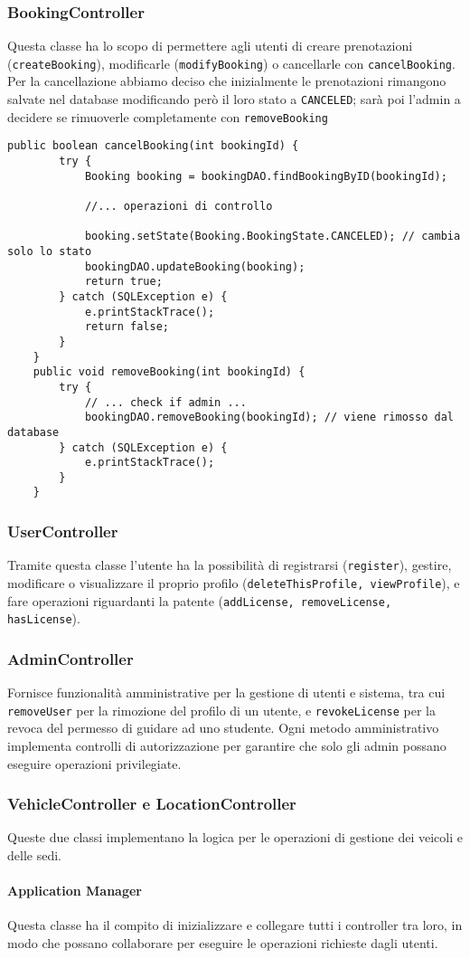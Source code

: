 \subsubsection{BookingController}
Questa classe ha lo scopo di permettere agli utenti di creare prenotazioni (\texttt{createBooking}), modificarle (\texttt{modifyBooking}) o cancellarle con \texttt{cancelBooking}. Per la cancellazione abbiamo deciso che inizialmente le prenotazioni rimangono salvate nel database modificando però il loro stato a \texttt{CANCELED}; sarà poi l'admin a decidere se rimuoverle completamente con \texttt{removeBooking}
\begin{lstlisting}[style=Java, caption={Cancellazione e rimozione di una Prenotazione in \texttt{BookingController}}]
    public boolean cancelBooking(int bookingId) {
        try {
            Booking booking = bookingDAO.findBookingByID(bookingId);
            
            //... operazioni di controllo

            booking.setState(Booking.BookingState.CANCELED); // cambia solo lo stato
            bookingDAO.updateBooking(booking); 
            return true;
        } catch (SQLException e) {
            e.printStackTrace();
            return false;
        }
    }
    public void removeBooking(int bookingId) {
        try {
            // ... check if admin ...
            bookingDAO.removeBooking(bookingId); // viene rimosso dal database
        } catch (SQLException e) {
            e.printStackTrace();
        }
    }
\end{lstlisting}
\subsubsection{UserController}
Tramite questa classe l'utente ha la possibilità di registrarsi (\texttt{register}), gestire, modificare o visualizzare il proprio profilo (\texttt{deleteThisProfile, viewProfile}), e fare operazioni riguardanti la patente (\texttt{addLicense, removeLicense, hasLicense}).
\subsubsection{AdminController}
Fornisce funzionalità amministrative per la gestione di utenti e sistema, tra cui \texttt{removeUser} per la rimozione del profilo di un utente, e \texttt{revokeLicense} per la revoca del permesso di guidare ad uno studente.
Ogni metodo amministrativo implementa controlli di autorizzazione per garantire che solo gli admin possano eseguire operazioni privilegiate.
\subsubsection{VehicleController e LocationController}
Queste due classi implementano la logica per le operazioni di gestione dei veicoli e delle sedi.

\paragraph{Application Manager}
Questa classe ha il compito di inizializzare e collegare tutti i controller tra loro, in modo che possano collaborare per eseguire le operazioni richieste dagli utenti.

